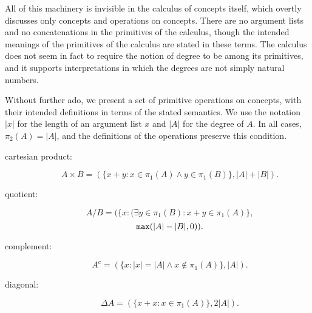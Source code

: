 \documentclass{slides}
\begin{document}
\begin{slide}

All of this machinery is invisible in the calculus of concepts itself, which overtly discusses only concepts and operations on concepts.  There are no argument lists and no concatenations in the primitives of the calculus, though the intended meanings of the primitives of the calculus are stated in these terms.  The calculus does not seem in fact to require the notion of degree to be among its primitives, and it supports interpretations in which the degrees are not simply natural numbers.

\end{slide}

\begin{slide}

Without further ado, we present a set of primitive operations on concepts, with their intended definitions in terms of the stated semantics.  We use the notation $|x|$ for the length of an argument list $x$ and $|A|$ for the degree of $A$.  In all cases, $\pi_2(A) = |A|$, and the definitions of the operations preserve this condition.

\begin{description}

\item[cartesian product:]  $$A \times B = (\{x+y:x \in \pi_1(A) \wedge y \in \pi_1(B)\},|A|+|B|).$$ 

\item[quotient:]  $$A/B = (\{x:(\exists y \in \pi_1(B):x+y \in \pi_1(A)\},$$ $${\tt max}(|A|-|B|,0)).$$

\end{description}

\end{slide}

\begin{slide}

\begin{description}

\item[complement:] $$A^c = (\{x:|x|=|A| \wedge x \not\in \pi_1(A)\},|A|).$$

\item[diagonal:]  $$\Delta A = (\{x+x:x \in \pi_1(A)\},2|A|).$$

\end{description}

\end{slide}
\end{document}

